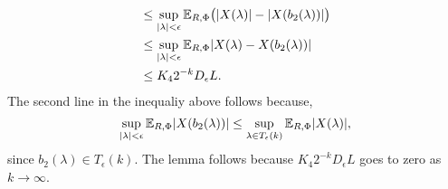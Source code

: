 \documentclass[journal]{IEEEtran}
\begin{document}
\begin{IEEEproof}
\begin{align*}
&\leq \sup_{{\vert \lambda \vert} < \epsilon} {\mathbb E}_{R,\Phi} \big( {\vert X(\lambda) \vert} - {\vert X(b_2(\lambda)) \vert} \big) \nonumber \\
&\leq \sup_{{\vert \lambda \vert} < \epsilon} {\mathbb E}_{R,\Phi} {\vert X(\lambda) - X(b_2(\lambda)) \vert} \nonumber \\
&\leq K_4 2^{-k} D_\epsilon L. \label{eq:Deps2nktozero}
\end{align*}
The second line in the inequaliy above follows because,
\[
\sup_{{\vert \lambda \vert} < \epsilon} {\mathbb E}_{R,\Phi} {\vert X(b_2(\lambda)) \vert} \leq \sup_{\lambda \in T_\epsilon(k)} {\mathbb E}_{R,\Phi} {\vert X(\lambda) \vert},
\]
since $b_2(\lambda) \in T_\epsilon(k)$.  The lemma follows because $K_4 2^{-k} D_\epsilon L$ goes to zero as $k\rightarrow\infty$.
\end{IEEEproof}




\end{document}
